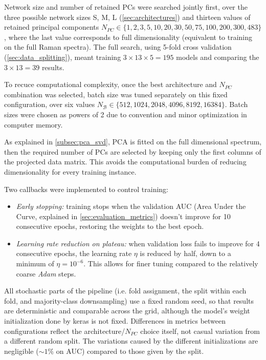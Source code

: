 Network size and number of retained PCs were searched jointly first, over the three possible network sizes S, M, L (\cref{sec:architectures}) and thirteen values of retained principal components $N_{PC} \in \{1, 2, 3, 5, 10, 20, 30, 50, 75, 100, 200, 300, 483\}$, where the last value corresponds to full dimensionality (equivalent to training on the full Raman spectra).
The full search, using 5-fold cross validation (\cref{sec:data_splitting}), meant training $3\times 13\times 5 = 195$ models and comparing the $3\times 13 = 39$ results.

To recuce computational complexity, once the best architecture and $N_{PC}$ combination was selected, batch size was tuned separately on this fixed configuration, over six values $N_\mathcal{B} \in \{512, 1024, 2048, 4096, 8192, 16384\}$. Batch sizes were chosen as powers of 2 due to convention and minor optimization in computer memory.

As explained in \cref{subsec:pca_svd}, PCA is fitted on the full dimensional spectrum, then the required number of PCs are selected by keeping only the first columns of the projected data matrix. This avoids the computational burden of reducing dimensionality for every training instance.

Two callbacks were implemented to control training:

\begin{itemize}
    \item \textit{Early stopping:} training stops when the validation AUC (Area Under the Curve, explained in \cref{sec:evaluation_metrics}) doesn't improve for 10 consecutive epochs, restoring the weights to the best epoch.
    \item \textit{Learning rate reduction on plateau:} when validation loss fails to improve for 4 consecutive epochs, the learning rate $\eta$ is reduced by half, down to a minimum of $\eta = 10^{-6}$. This allows for finer tuning compared to the relatively coarse \textit{Adam} steps.
\end{itemize}

All stochastic parts of the pipeline (i.e. fold assignment, the split within each fold, and majority-class downsampling) use a fixed random seed, so that results are deterministic and comparable across the grid, although the model's weight initialization done by keras is not fixed. Differences in metrics between configurations reflect the architecture/$N_{PC}$ choice itself, not casual variation from a different random split. The variations caused by the different initializations are negligible ($\sim1\%$ on AUC) compared to those given by the split.



